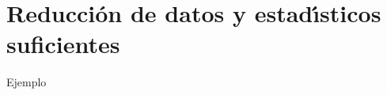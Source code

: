 
\section{Reducci\'{o}n de datos y estad\'{\i}sticos suficientes}
\begin{problem}
Ejemplo
\end{problem}


